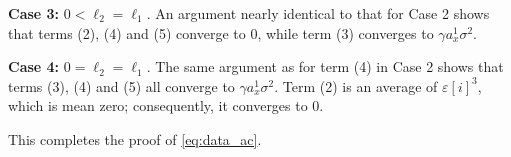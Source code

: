 \documentclass[english,11pt]{article}
\newcommand{\ep}{\varepsilon}
\newcommand{\1}{\mathbf{1}}
\numberwithin{equation}{section}
\theoremstyle{plain}
\theoremstyle{definition}
\theoremstyle{remark}
\theoremstyle{plain}
\theoremstyle{remark}
\theoremstyle{plain}
\theoremstyle{plain}
\begin{document}
{\bf Case 3:} $0<\ell_2 = \ell_1$. An argument nearly identical to that for Case 2 shows that terms (2), (4) and (5) converge to 0, while term (3) converges to $\gamma a_x^1 \sigma^2$.

{\bf Case 4:} $0=\ell_2 = \ell_1$. The same argument as for term (4) in Case 2 shows that terms (3), (4) and (5) all converge to $\gamma a_x^1 \sigma^2$. Term (2) is an average of $\ep[i]^3$, which is mean zero; consequently, it converges to 0.


This completes the proof of \eqref{eq:data_ac}.

\end{document}
